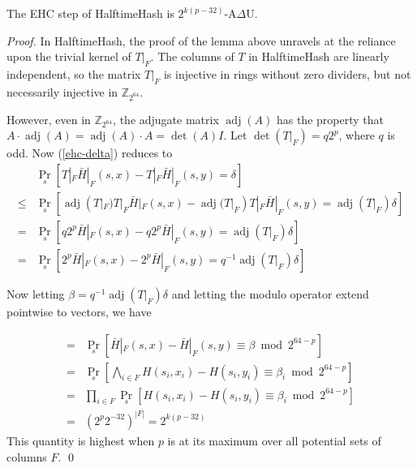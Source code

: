 \documentclass[runningheads]{llncs}
\DeclareMathOperator{\adj}{adj}
\newcommand{\ints}{\mathbb{Z}}
\begin{document}
\begin{theorem}
  The EHC step of HalftimeHash is $2^{k(p-32)}$-A$\Delta$U.
\end{theorem}

\begin{proof}
  In HalftimeHash, the proof of the lemma above unravels at the reliance upon the trivial kernel of $T|_F$.
  The columns of $T$ in HalftimeHash are linearly independent, so the matrix $T|_F$ is injective in rings without zero dividers, but not necessarily injective in $\ints_{2^{64}}$.

  However, even in $\ints_{2^{64}}$, the adjugate matrix $\adj(A)$ has the property that $A \cdot \adj(A) = \adj(A) \cdot A = \det(A) I$.
  Let $\det(T|_F) = q2^p$, where $q$ is odd.
  Now (\ref{ehc-delta}) reduces to
  \[
  \begin{array}{rl}
    &   \Pr_s[T|_F \bar{H}|_F(s,x) - T|_F \bar{H}|_F(s,y) = \delta]\\
    \leq &  \Pr_s[\adj(T|_F) T|_F \bar{H}|_F(s,x) - \adj(T|_F) T|_F \bar{H}|_F(s,y) = \adj(T|_F) \delta] \\
    = &  \Pr_s[q2^p\bar{H}|_F(s,x) - q2^p\bar{H}|_F(s,y) = \adj(T|_F) \delta] \\
    = &  \Pr_s[2^p\bar{H}|_F(s,x) - 2^p\bar{H}|_F(s,y) = q^{-1} \adj(T|_F) \delta]
  \end{array}
  \]

  Now letting $\beta = q^{-1} \adj(T|_F) \delta$ and letting the modulo operator extend pointwise to vectors, we have

  \[
  \begin{array}{rl}
    = &  \Pr_s[\bar{H}|_F(s,x) - \bar{H}|_F(s,y) \equiv \beta \bmod 2^{64-p}] \\
    = &  \Pr_s\left[\bigwedge_{i \in F} H(s_i,x_i) - H(s_i,y_i) \equiv \beta_i \bmod 2^{64-p}\right] \\
    = &  \prod_{i \in F} \Pr_s\left[ H(s_i,x_i) - H(s_i,y_i) \equiv \beta_i \bmod 2^{64-p}\right] \\
    = & \left(2^p 2^{-32}\right)^{|F|} = 2^{k(p-32)}
  \end{array}
  \]
  This quantity is highest when $p$ is at its maximum over all potential sets of columns $F$. \qed
\end{proof}




\end{document}

